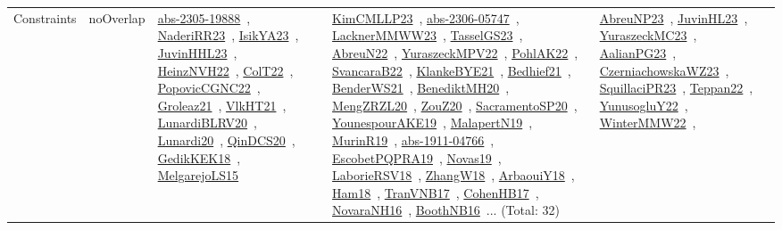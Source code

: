 {\begin{longtable}{lp{3cm}>{\raggedright\arraybackslash}p{6cm}>{\raggedright\arraybackslash}p{6cm}>{\raggedright\arraybackslash}p{8cm}}
Constraints & noOverlap & \href{works/abs-2305-19888.pdf}{abs-2305-19888}~\cite{abs-2305-19888}, \href{works/NaderiRR23.pdf}{NaderiRR23}~\cite{NaderiRR23}, \href{works/IsikYA23.pdf}{IsikYA23}~\cite{IsikYA23}, \href{works/JuvinHHL23.pdf}{JuvinHHL23}~\cite{JuvinHHL23}, \href{works/HeinzNVH22.pdf}{HeinzNVH22}~\cite{HeinzNVH22}, \href{works/ColT22.pdf}{ColT22}~\cite{ColT22}, \href{works/PopovicCGNC22.pdf}{PopovicCGNC22}~\cite{PopovicCGNC22}, \href{works/Groleaz21.pdf}{Groleaz21}~\cite{Groleaz21}, \href{works/VlkHT21.pdf}{VlkHT21}~\cite{VlkHT21}, \href{works/LunardiBLRV20.pdf}{LunardiBLRV20}~\cite{LunardiBLRV20}, \href{works/Lunardi20.pdf}{Lunardi20}~\cite{Lunardi20}, \href{works/QinDCS20.pdf}{QinDCS20}~\cite{QinDCS20}, \href{works/GedikKEK18.pdf}{GedikKEK18}~\cite{GedikKEK18}, \href{works/MelgarejoLS15.pdf}{MelgarejoLS15}~\cite{MelgarejoLS15} & \href{works/KimCMLLP23.pdf}{KimCMLLP23}~\cite{KimCMLLP23}, \href{works/abs-2306-05747.pdf}{abs-2306-05747}~\cite{abs-2306-05747}, \href{works/LacknerMMWW23.pdf}{LacknerMMWW23}~\cite{LacknerMMWW23}, \href{works/TasselGS23.pdf}{TasselGS23}~\cite{TasselGS23}, \href{works/AbreuN22.pdf}{AbreuN22}~\cite{AbreuN22}, \href{works/YuraszeckMPV22.pdf}{YuraszeckMPV22}~\cite{YuraszeckMPV22}, \href{works/PohlAK22.pdf}{PohlAK22}~\cite{PohlAK22}, \href{works/SvancaraB22.pdf}{SvancaraB22}~\cite{SvancaraB22}, \href{works/KlankeBYE21.pdf}{KlankeBYE21}~\cite{KlankeBYE21}, \href{works/Bedhief21.pdf}{Bedhief21}~\cite{Bedhief21}, \href{works/BenderWS21.pdf}{BenderWS21}~\cite{BenderWS21}, \href{works/BenediktMH20.pdf}{BenediktMH20}~\cite{BenediktMH20}, \href{works/MengZRZL20.pdf}{MengZRZL20}~\cite{MengZRZL20}, \href{works/ZouZ20.pdf}{ZouZ20}~\cite{ZouZ20}, \href{works/SacramentoSP20.pdf}{SacramentoSP20}~\cite{SacramentoSP20}, \href{works/YounespourAKE19.pdf}{YounespourAKE19}~\cite{YounespourAKE19}, \href{works/MalapertN19.pdf}{MalapertN19}~\cite{MalapertN19}, \href{works/MurinR19.pdf}{MurinR19}~\cite{MurinR19}, \href{works/abs-1911-04766.pdf}{abs-1911-04766}~\cite{abs-1911-04766}, \href{works/EscobetPQPRA19.pdf}{EscobetPQPRA19}~\cite{EscobetPQPRA19}, \href{works/Novas19.pdf}{Novas19}~\cite{Novas19}, \href{works/LaborieRSV18.pdf}{LaborieRSV18}~\cite{LaborieRSV18}, \href{works/ZhangW18.pdf}{ZhangW18}~\cite{ZhangW18}, \href{works/ArbaouiY18.pdf}{ArbaouiY18}~\cite{ArbaouiY18}, \href{works/Ham18.pdf}{Ham18}~\cite{Ham18}, \href{works/TranVNB17.pdf}{TranVNB17}~\cite{TranVNB17}, \href{works/CohenHB17.pdf}{CohenHB17}~\cite{CohenHB17}, \href{works/NovaraNH16.pdf}{NovaraNH16}~\cite{NovaraNH16}, \href{works/BoothNB16.pdf}{BoothNB16}~\cite{BoothNB16}... (Total: 32) & \href{works/AbreuNP23.pdf}{AbreuNP23}~\cite{AbreuNP23}, \href{works/JuvinHL23.pdf}{JuvinHL23}~\cite{JuvinHL23}, \href{works/YuraszeckMC23.pdf}{YuraszeckMC23}~\cite{YuraszeckMC23}, \href{works/AalianPG23.pdf}{AalianPG23}~\cite{AalianPG23}, \href{works/CzerniachowskaWZ23.pdf}{CzerniachowskaWZ23}~\cite{CzerniachowskaWZ23}, \href{works/SquillaciPR23.pdf}{SquillaciPR23}~\cite{SquillaciPR23}, \href{works/Teppan22.pdf}{Teppan22}~\cite{Teppan22}, \href{works/YunusogluY22.pdf}{YunusogluY22}~\cite{YunusogluY22}, \href{works/WinterMMW22.pdf}{WinterMMW22}~\cite{WinterMMW22}, 
\end{longtable}}
